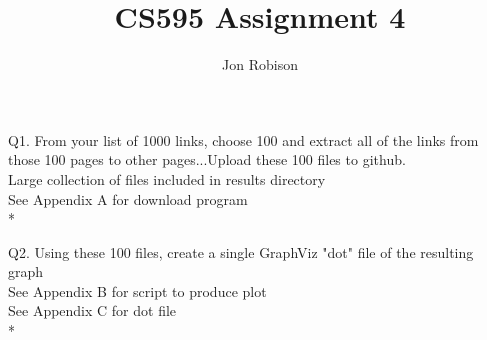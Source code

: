 \documentclass{article}
\begin{document}
\author{Jon Robison}
\title{CS595 Assignment 4}
\maketitle

Q1. From your list of 1000 links, choose 100 and extract all of the links from
those 100 pages to other pages...Upload these 100 files to github. \\
Large collection of files included in results directory \\
See Appendix A for download program
\\*

Q2. Using these 100 files, create a single GraphViz "dot" file of the resulting
graph \\
See Appendix B for script to produce plot \\
See Appendix C for dot file
\\*
\end{document}
